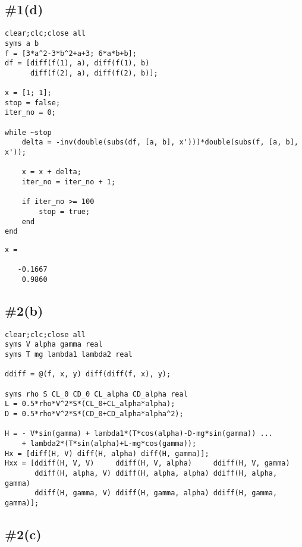 \documentclass[12pt]{article}
\begin{document}





\subsection*{\#1(d)}

\begin{verbatim}
clear;clc;close all
syms a b
f = [3*a^2-3*b^2+a+3; 6*a*b+b];
df = [diff(f(1), a), diff(f(1), b)
      diff(f(2), a), diff(f(2), b)];

x = [1; 1];
stop = false;
iter_no = 0;

while ~stop
    delta = -inv(double(subs(df, [a, b], x')))*double(subs(f, [a, b], x'));

    x = x + delta;
    iter_no = iter_no + 1;

    if iter_no >= 100
        stop = true;
    end
end
\end{verbatim}

        \color{lightgray} \begin{verbatim}
x =

   -0.1667
    0.9860

\end{verbatim} \color{black}




\subsection*{\#2(b)}

\begin{verbatim}
clear;clc;close all
syms V alpha gamma real
syms T mg lambda1 lambda2 real

ddiff = @(f, x, y) diff(diff(f, x), y);

syms rho S CL_0 CD_0 CL_alpha CD_alpha real
L = 0.5*rho*V^2*S*(CL_0+CL_alpha*alpha);
D = 0.5*rho*V^2*S*(CD_0+CD_alpha*alpha^2);

H = - V*sin(gamma) + lambda1*(T*cos(alpha)-D-mg*sin(gamma)) ...
    + lambda2*(T*sin(alpha)+L-mg*cos(gamma));
Hx = [diff(H, V) diff(H, alpha) diff(H, gamma)];
Hxx = [ddiff(H, V, V)     ddiff(H, V, alpha)     ddiff(H, V, gamma)
       ddiff(H, alpha, V) ddiff(H, alpha, alpha) ddiff(H, alpha, gamma)
       ddiff(H, gamma, V) ddiff(H, gamma, alpha) ddiff(H, gamma, gamma)];
\end{verbatim}


\subsection*{\#2(c)}
\end{document}
